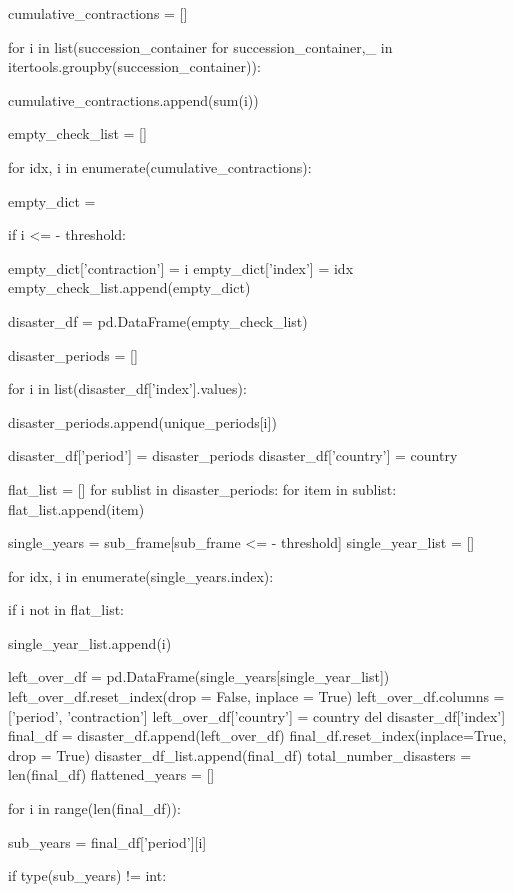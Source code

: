 {{{{\begin{python}
    cumulative_contractions = []
    
    for i in list(succession_container for succession_container,_ in itertools.groupby(succession_container)):
        
        cumulative_contractions.append(sum(i))
        
    empty_check_list = []

    for idx, i in enumerate(cumulative_contractions):
    
        empty_dict = {}
    
        if i <= - threshold:
        
            empty_dict['contraction'] = i
            empty_dict['index'] = idx
			empty_check_list.append(empty_dict)
            
    disaster_df = pd.DataFrame(empty_check_list)
            
    disaster_periods = []

    for i in list(disaster_df['index'].values):
    
        disaster_periods.append(unique_periods[i])
        
    disaster_df['period'] = disaster_periods
    disaster_df['country'] = country
        
    flat_list = []
    for sublist in disaster_periods:
        for item in sublist:
            flat_list.append(item)          
            
    single_years = sub_frame[sub_frame <= - threshold]
    single_year_list = []

    for idx, i in enumerate(single_years.index):
    
        if i not in flat_list:
        
            single_year_list.append(i)
    
    left_over_df = pd.DataFrame(single_years[single_year_list])
    left_over_df.reset_index(drop = False, inplace = True)
    left_over_df.columns = ['period', 'contraction']
    left_over_df['country'] = country
    del disaster_df['index']
    final_df = disaster_df.append(left_over_df)
    final_df.reset_index(inplace=True, drop = True)
    disaster_df_list.append(final_df)
    total_number_disasters = len(final_df)
    flattened_years = []

    for i in range(len(final_df)):
    
        sub_years = final_df['period'][i]
    
        if type(sub_years) != int:
        

\end{python}}}}}
